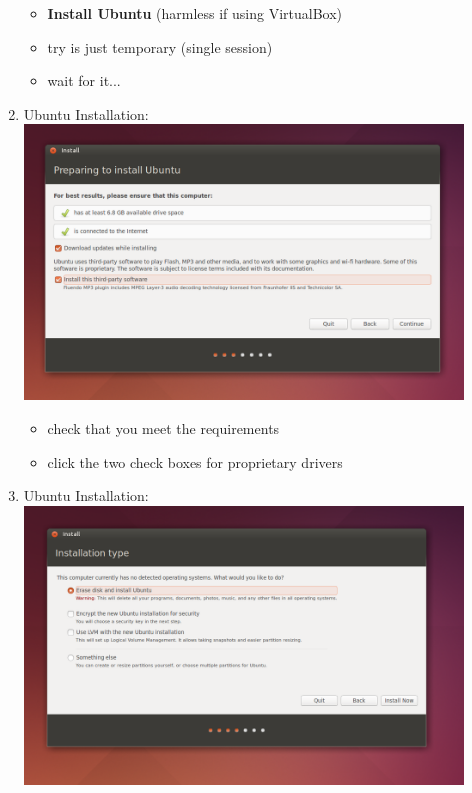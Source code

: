 \documentclass[12pt]{article}
\begin{document}
\begin{description}
\begin{enumerate}
\begin{itemize}
                 \item {\bf Install Ubuntu} (harmless if using VirtualBox)
                 \item try is just temporary (single session)
                 \item wait for it...    
            \end{itemize}
	\newpage
\item Ubuntu Installation: \vspace{20mm} \\
      		\includegraphics[scale=.6]{Capture11.png} 
            \begin{itemize}
                    \item check that you meet the requirements
                 \item click the two check boxes for proprietary drivers
            \end{itemize}
	\newpage
\item Ubuntu Installation: \vspace{20mm} \\
      		\includegraphics[scale=.6]{Capture12.png}\\
             \begin{itemize}
                    

\end{itemize}
\end{enumerate}
\end{description}
\end{document}
